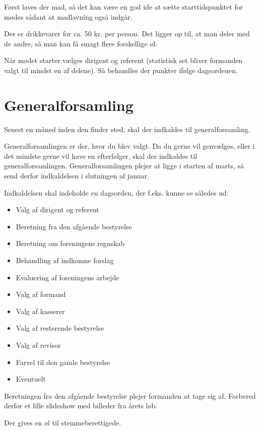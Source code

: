 Først laves der mad, så det kan være en god ide at sætte starttidspunktet for
mødes sådant at madlavning også indgår. 

Der er drikkevarer for ca. 50 kr. per person. 
Det ligger op til, at man deler med de andre, så man kan få smagt flere forskellige øl.


Når mødet starter vælges dirigent og referent (statistisk set bliver
formanden valgt til mindst en af delene). Så behandles der punkter
ifølge dagsordenen.

\section{Generalforsamling}
\label{sec:generalforsamling}

Senest en måned inden den finder sted, skal der indkaldes til generalforsamling.

Generalforsamlingen er der, hvor du blev valgt. Da du gerne vil
genvælges, eller i det mindste gerne vil have en efterfølger, skal der
indkaldes til generalforsamlingen. Generalforsamlingen plejer at ligge
i starten af marts, så send derfor indkaldelsen i slutningen af januar.

Indkaldelsen skal indeholde en dagsorden, der f.eks. kunne se således ud:
\begin{itemize}
    \item Valg af dirigent og referent
    \item Beretning fra den afgående bestyrelse
    \item Beretning om foreningens regnskab
    \item Behandling af indkomne forslag
    \item Evaluering af foreningens arbejde
    \item Valg af formand
    \item Valg af kasserer
    \item Valg af resterende bestyrelse
    \item Valg af revisor
    \item Farvel til den gamle bestyrelse
    \item Eventuelt
\end{itemize}

Beretningen fra den afgående bestyrelse plejer formanden at tage sig
af. Forbered derfor et lille slideshow med billeder fra årets løb.

Der gives en øl til stemmeberettigede.

